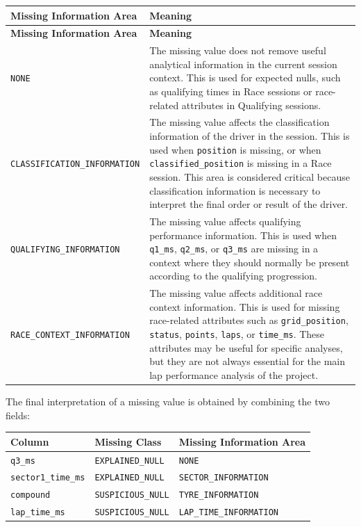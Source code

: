 \documentclass[a4paper,11pt]{article}
\begin{document}
	\begin{longtable}{p{5cm}p{9.5cm}}
		\toprule
		\textbf{Missing Information Area} & \textbf{Meaning} \\
		\midrule
		\endfirsthead
		
		\toprule
		\textbf{Missing Information Area} & \textbf{Meaning} \\
		\midrule
		\endhead
		
		\texttt{NONE}
		& The missing value does not remove useful analytical information in the current session context.
		This is used for expected nulls, such as qualifying times in Race sessions or race-related attributes in Qualifying sessions. \\
		\midrule
		
		\texttt{CLASSIFICATION\_INFORMATION}
		& The missing value affects the classification information of the driver in the session.
		This is used when \texttt{position} is missing, or when \texttt{classified\_position} is missing in a Race session.
		This area is considered critical because classification information is necessary to interpret the final order or result of the driver. \\
		\midrule
		
		\texttt{QUALIFYING\_INFORMATION}
		& The missing value affects qualifying performance information.
		This is used when \texttt{q1\_ms}, \texttt{q2\_ms}, or \texttt{q3\_ms} are missing in a context where they should normally be present according to the qualifying progression. \\
		\midrule
		
		\texttt{RACE\_CONTEXT\_INFORMATION}
		& The missing value affects additional race context information.
		This is used for missing race-related attributes such as \texttt{grid\_position}, \texttt{status}, \texttt{points}, \texttt{laps}, or \texttt{time\_ms}.
		These attributes may be useful for specific analyses, but they are not always essential for the main lap performance analysis of the project. \\
		\bottomrule
	\end{longtable}
	
	The final interpretation of a missing value is obtained by combining the two fields:
	
	\begin{center}
		\begin{tabular}{lll}
			\toprule
			\textbf{Column} & \textbf{Missing Class} & \textbf{Missing Information Area} \\
			\midrule
			\texttt{q3\_ms} & \texttt{EXPLAINED\_NULL} & \texttt{NONE} \\
			\texttt{sector1\_time\_ms} & \texttt{EXPLAINED\_NULL} & \texttt{SECTOR\_INFORMATION} \\
			\texttt{compound} & \texttt{SUSPICIOUS\_NULL} & \texttt{TYRE\_INFORMATION} \\
			\texttt{lap\_time\_ms} & \texttt{SUSPICIOUS\_NULL} & \texttt{LAP\_TIME\_INFORMATION} \\
			\bottomrule
		\end{tabular}
	\end{center}
	
\end{document}
